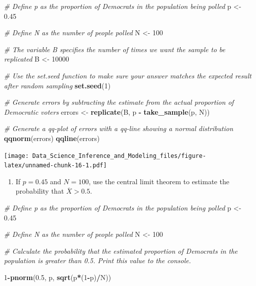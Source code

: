 \documentclass[
]{article}
\newenvironment{Shaded}{\begin{snugshade}}{\end{snugshade}}
\newcommand{\CommentTok}[1]{\textcolor[rgb]{0.56,0.35,0.01}{\textit{#1}}}
\newcommand{\DecValTok}[1]{\textcolor[rgb]{0.00,0.00,0.81}{#1}}
\newcommand{\FloatTok}[1]{\textcolor[rgb]{0.00,0.00,0.81}{#1}}
\newcommand{\KeywordTok}[1]{\textcolor[rgb]{0.13,0.29,0.53}{\textbf{#1}}}
\newcommand{\NormalTok}[1]{#1}
\newcommand{\OperatorTok}[1]{\textcolor[rgb]{0.81,0.36,0.00}{\textbf{#1}}}
\newcommand{\StringTok}[1]{\textcolor[rgb]{0.31,0.60,0.02}{#1}}
\providecommand{\tightlist}{%
  \setlength{\itemsep}{0pt}\setlength{\parskip}{0pt}}
\begin{document}
\begin{Shaded}
\begin{Highlighting}[]
\CommentTok{\# Define \textasciigrave{}p\textasciigrave{} as the proportion of Democrats in the population being polled}
\NormalTok{p \textless{}{-}}\StringTok{ }\FloatTok{0.45}

\CommentTok{\# Define \textasciigrave{}N\textasciigrave{} as the number of people polled}
\NormalTok{N \textless{}{-}}\StringTok{ }\DecValTok{100}

\CommentTok{\# The variable \textasciigrave{}B\textasciigrave{} specifies the number of times we want the sample to be replicated}
\NormalTok{B \textless{}{-}}\StringTok{ }\DecValTok{10000}

\CommentTok{\# Use the \textasciigrave{}set.seed\textasciigrave{} function to make sure your answer matches the expected result after random sampling}
\KeywordTok{set.seed}\NormalTok{(}\DecValTok{1}\NormalTok{)}

\CommentTok{\# Generate \textasciigrave{}errors\textasciigrave{} by subtracting the estimate from the actual proportion of Democratic voters}
\NormalTok{errors \textless{}{-}}\StringTok{ }\KeywordTok{replicate}\NormalTok{(B, p }\OperatorTok{{-}}\StringTok{ }\KeywordTok{take\_sample}\NormalTok{(p, N))}

\CommentTok{\# Generate a qq{-}plot of \textasciigrave{}errors\textasciigrave{} with a qq{-}line showing a normal distribution}
\KeywordTok{qqnorm}\NormalTok{(errors)}
\KeywordTok{qqline}\NormalTok{(errors)}
\end{Highlighting}
\end{Shaded}

\texttt{[image: Data\_Science\_Inference\_and\_Modeling\_files/figure-latex/unnamed-chunk-16-1.pdf]}

\begin{enumerate}
\def\labelenumi{\arabic{enumi}.}
\setcounter{enumi}{11}
\tightlist
\item
  If \(p = 0.45\) and \(N = 100\), use the central limit theorem to
  estimate the probability that \(\overline{X} > 0.5\).
\end{enumerate}

\begin{Shaded}
\begin{Highlighting}[]
\CommentTok{\# Define \textasciigrave{}p\textasciigrave{} as the proportion of Democrats in the population being polled}
\NormalTok{p \textless{}{-}}\StringTok{ }\FloatTok{0.45}

\CommentTok{\# Define \textasciigrave{}N\textasciigrave{} as the number of people polled}
\NormalTok{N \textless{}{-}}\StringTok{ }\DecValTok{100}

\CommentTok{\# Calculate the probability that the estimated proportion of Democrats in the population is greater than 0.5. Print this value to the console.}

\DecValTok{1}\OperatorTok{{-}}\KeywordTok{pnorm}\NormalTok{(}\FloatTok{0.5}\NormalTok{, p, }\KeywordTok{sqrt}\NormalTok{(p}\OperatorTok{*}\NormalTok{(}\DecValTok{1}\OperatorTok{{-}}\NormalTok{p)}\OperatorTok{/}\NormalTok{N))}
\end{Highlighting}
\end{Shaded}
\end{document}
